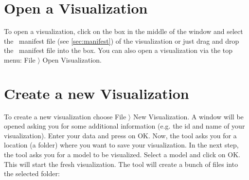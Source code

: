 \section{Open a Visualization}
\label{open_vis_template}

To open a visualization, click on the box in the middle of the window and select the \bms\ manifest file (see \ref{sec:manifest}) of the visualization or just drag and drop the \bms\ manifest file into the box.
You can also open a visualization via the top menu: \textsf{File $\rangle$ Open Visualization}.

\section{Create a new Visualization}
\label{vis_template}

To create a new visualization choose \textsf{File $\rangle$ New Visualization}.
A window will be opened asking you for some additional information (e.g. the id and name of your visualization).
Enter your data and press on OK.
Now, the tool asks you for a location (a folder) where you want to save your visualization.
In the next step, the tool asks you for a model to be visualized.
Select a model and click on OK.
This will start the fresh visualization.
The tool will create a bunch of files into the selected folder:





